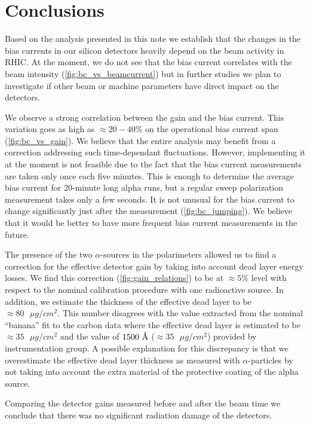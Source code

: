 \documentclass[a4paper,12pt]{article}
\newcommand{\angstrom}{\mbox{\normalfont\AA}}
\begin{document}
\section{Conclusions}

Based on the analysis presented in this note we establish that the changes in
the bias currents in our silicon detectors heavily depend on the beam activity
in RHIC. At the moment, we do not see that the bias current correlates with
the beam intensity (\cref{fig:bc_vs_beamcurrent}) but in further studies we
plan to investigate if other beam or machine parameters have direct impact on
the detectors.

We observe a strong correlation between the gain and the bias current.
This variation goes as high as $\approx 20-40\%$ on the operational bias current
span (\cref{fig:bc_vs_gain}). We believe that the entire analysis
may benefit from a correction addressing such time-dependant fluctuations.
However, implementing it at the moment is not feasible due to
the fact that the bias current measurements are taken only once each five minutes.
This is enough to determine the average bias current for 20-minute long alpha runs, but
a regular sweep polarization measurement takes only a few seconds. It is not
unusual for the bias current to change significantly just after the measurement (\cref{fig:bc_jumping}).
We believe that it would be better to have more frequent bias current measurements in the future.

The presence of the two $\alpha$-sources in the polarimeters allowed us to find
a correction for the effective detector gain by taking into account dead layer
energy losses. We find this correction (\cref{fig:gain_relations}) to be at $\approx 5\%$ level
with respect to the nominal calibration procedure with one radioactive source.
In addition, we estimate the thickness of the effective dead layer to be
$\approx 80\text{ }\mu g/cm^2$. This number disagrees with the value extracted
from the nominal ``banana'' fit to the carbon data where the effective dead layer is
estimated to be $\approx 35\text{ }\mu g/cm^2$ and the value of $1500\text{ }\angstrom$
($\approx 35\text{ }\mu g/cm^2$) provided by instrumentation group.
A possible explanation for this discrepancy
is that we overestimate the effective dead layer thickness as measured with
$\alpha$-particles by not taking into account the extra material of the protective
coating of the alpha source.

Comparing the detector gains measured before and after the beam time we conclude
that there was no significant radiation damage of the detectors.
\end{document}

